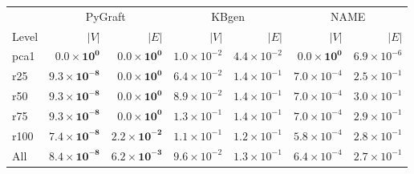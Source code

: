 \begin{tabular}{lrr|rr|rr}
\toprule
 & \multicolumn{2}{c|}{PyGraft} & \multicolumn{2}{c|}{KBgen} & \multicolumn{2}{c}{NAME} \\
Level & $|V|$ & $|E|$ & $|V|$ & $|E|$ & $|V|$ & $|E|$ \\
\midrule
pca1 & $\mathbf{0.0\times10^{0}}$ & $\mathbf{0.0\times10^{0}}$ & $1.0\times10^{-2}$ & $4.4\times10^{-2}$ & $\mathbf{0.0\times10^{0}}$ & $6.9\times10^{-6}$ \\
r25 & $\mathbf{9.3\times10^{-8}}$ & $\mathbf{0.0\times10^{0}}$ & $6.4\times10^{-2}$ & $1.4\times10^{-1}$ & $7.0\times10^{-4}$ & $2.5\times10^{-1}$ \\
r50 & $\mathbf{9.3\times10^{-8}}$ & $\mathbf{0.0\times10^{0}}$ & $8.9\times10^{-2}$ & $1.4\times10^{-1}$ & $7.0\times10^{-4}$ & $3.0\times10^{-1}$ \\
r75 & $\mathbf{9.3\times10^{-8}}$ & $\mathbf{0.0\times10^{0}}$ & $1.3\times10^{-1}$ & $1.4\times10^{-1}$ & $7.0\times10^{-4}$ & $2.9\times10^{-1}$ \\
r100 & $\mathbf{7.4\times10^{-8}}$ & $\mathbf{2.2\times10^{-2}}$ & $1.1\times10^{-1}$ & $1.2\times10^{-1}$ & $5.8\times10^{-4}$ & $2.8\times10^{-1}$ \\
\midrule
All & $\mathbf{8.4\times10^{-8}}$ & $\mathbf{6.2\times10^{-3}}$ & $9.6\times10^{-2}$ & $1.3\times10^{-1}$ & $6.4\times10^{-4}$ & $2.7\times10^{-1}$ \\
\bottomrule
\end{tabular}
